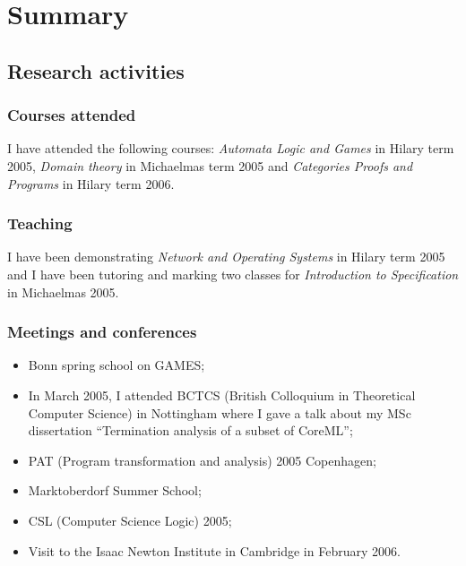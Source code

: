 \documentclass[nocenter]{thesis}
\begin{document}
\tableofcontents


\chapter{Summary}

\section{Research activities}

\subsection{Courses attended}

I have attended the following courses: \emph{Automata Logic and
Games} in Hilary term 2005, \emph{Domain theory} in Michaelmas term
2005 and \emph{Categories Proofs and Programs} in Hilary term 2006.

\subsection{Teaching}

I have been demonstrating \emph{Network and Operating Systems} in
Hilary term 2005 and I have been tutoring and marking two classes
for \emph{Introduction to Specification} in Michaelmas 2005.

\subsection{Meetings and conferences}

\begin{itemize}
\item Bonn spring school on GAMES;

\item  In March 2005, I attended BCTCS (British Colloquium in
Theoretical Computer Science) in Nottingham  where I gave a talk
about my MSc dissertation ``Termination analysis of a subset of
CoreML'';

\item PAT (Program transformation and analysis) 2005 Copenhagen;
\item Marktoberdorf Summer School;
\item CSL (Computer Science Logic) 2005;
\item Visit to the Isaac Newton Institute in Cambridge in February
2006.
\end{itemize}
\end{document}
